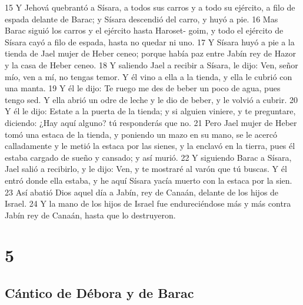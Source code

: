 15 Y Jehová quebrantó a Sísara, a todos sus carros y a todo su ejército, a filo de espada delante de Barac; y Sísara descendió del carro, y huyó a pie.
16 Mas Barac siguió los carros y el ejército hasta Haroset- goim, y todo el ejército de Sísara cayó a filo de espada, hasta no quedar ni uno.
17 Y Sísara huyó a pie a la tienda de Jael mujer de Heber ceneo; porque había paz entre Jabín rey de Hazor y la casa de Heber ceneo.
18 Y saliendo Jael a recibir a Sísara, le dijo: Ven, señor mío, ven a mí, no tengas temor. Y él vino a ella a la tienda, y ella le cubrió con una manta.
19 Y él le dijo: Te ruego me des de beber un poco de agua, pues tengo sed. Y ella abrió un odre de leche y le dio de beber, y le volvió a cubrir.
20 Y él le dijo: Estate a la puerta de la tienda; y si alguien viniere, y te preguntare, diciendo: ¿Hay aquí alguno? tú responderás que no.
21 Pero Jael mujer de Heber tomó una estaca de la tienda, y poniendo un mazo en su mano, se le acercó calladamente y le metió la estaca por las sienes, y la enclavó en la tierra, pues él estaba cargado de sueño y cansado; y así murió.
22 Y siguiendo Barac a Sísara, Jael salió a recibirlo, y le dijo: Ven, y te mostraré al varón que tú buscas. Y él entró donde ella estaba, y he aquí Sísara yacía muerto con la estaca por la sien.
23 Así abatió Dios aquel día a Jabín, rey de Canaán, delante de los hijos de Israel.
24 Y la mano de los hijos de Israel fue endureciéndose más y más contra Jabín rey de Canaán, hasta que lo destruyeron.

\chapter{5}

\section*{Cántico de Débora y de Barac}


